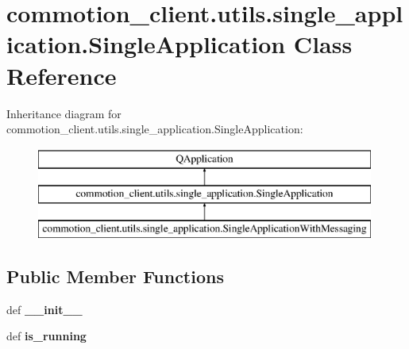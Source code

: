 \hypertarget{classcommotion__client_1_1utils_1_1single__application_1_1SingleApplication}{\section{commotion\-\_\-client.\-utils.\-single\-\_\-application.\-Single\-Application Class Reference}
\label{classcommotion__client_1_1utils_1_1single__application_1_1SingleApplication}
}
Inheritance diagram for commotion\-\_\-client.\-utils.\-single\-\_\-application.\-Single\-Application\-:\begin{figure}[H]
\begin{center}
\leavevmode
\includegraphics[height=3.000000cm]{classcommotion__client_1_1utils_1_1single__application_1_1SingleApplication}
\end{center}
\end{figure}
\subsection*{Public Member Functions}
\begin{DoxyCompactItemize}
\item 
\hypertarget{classcommotion__client_1_1utils_1_1single__application_1_1SingleApplication_a5d403bbba596b540b6ecb580205111b5}{def {\bfseries \-\_\-\-\_\-init\-\_\-\-\_\-}}\label{classcommotion__client_1_1utils_1_1single__application_1_1SingleApplication_a5d403bbba596b540b6ecb580205111b5}

\item 
\hypertarget{classcommotion__client_1_1utils_1_1single__application_1_1SingleApplication_acf757577a5b8729d162c828275e1b948}{def {\bfseries is\-\_\-running}}\label{classcommotion__client_1_1utils_1_1single__application_1_1SingleApplication_acf757577a5b8729d162c828275e1b948}

\end{DoxyCompactItemize}
